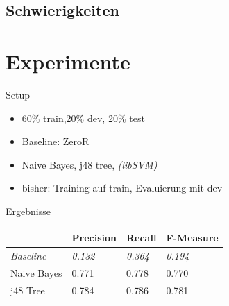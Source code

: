 \documentclass[10pt]{beamer}
\begin{document}
\subsection{Schwierigkeiten}
\section{Experimente}
\begin{frame}{Setup}

\begin{itemize}
	\item 60\% train,20\% dev, 20\% test
	\item Baseline: ZeroR
	\item Naive Bayes, j48 tree, \textit{(libSVM)} 
	\item bisher: Training auf train, Evaluierung mit dev
\end{itemize}

\end{frame}

\begin{frame}{Ergebnisse}
\begin{table}[h]
\begin{tabular}{l|lll}
                  & Precision      & Recall         & F-Measure      \\ \hline
\textit{Baseline} & \textit{0.132} & \textit{0.364} & \textit{0.194} \\ \hline
Naive Bayes       & 0.771          & 0.778          & 0.770          \\
j48 Tree          & 0.784      	   & 0.786             & 0.781            
\end{tabular}
\end{table}
\end{frame}
\end{document}
